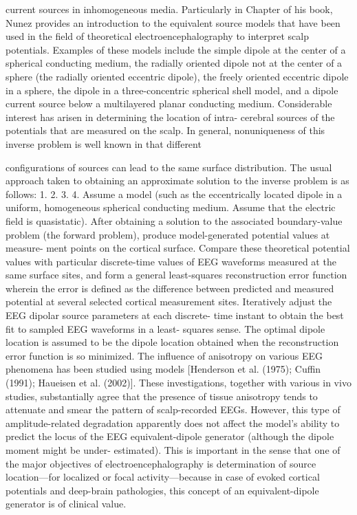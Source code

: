 current sources in inhomogeneous media. Particularly in Chapter of his book,
Nunez provides an introduction to the equivalent source models that have
been used in the field of theoretical electroencephalography to interpret scalp
potentials. Examples of these models include the simple dipole at the center of
a spherical conducting medium, the radially oriented dipole not at the center of
a sphere (the radially oriented eccentric dipole), the freely oriented eccentric
dipole in a sphere, the dipole in a three-concentric spherical shell model, and a
dipole current source below a multilayered planar conducting medium.
Considerable interest has arisen in determining the location of intra-
cerebral sources of the potentials that are measured on the scalp. In general,
nonuniqueness of this inverse problem is well known in that different

configurations of sources can lead to the same surface distribution. The usual
approach taken to obtaining an approximate solution to the inverse problem is
as follows:
1.
2.
3.
4.
Assume a model (such as the eccentrically located dipole in a uniform,
homogeneous spherical conducting medium. Assume that the electric
field is quasistatic).
After obtaining a solution to the associated boundary-value problem (the
forward problem), produce model-generated potential values at measure-
ment points on the cortical surface.
Compare these theoretical potential values with particular discrete-time
values of EEG waveforms measured at the same surface sites, and form a
general least-squares reconstruction error function wherein the error is
defined as the difference between predicted and measured potential at
several selected cortical measurement sites.
Iteratively adjust the EEG dipolar source parameters at each discrete-
time instant to obtain the best fit to sampled EEG waveforms in a least-
squares sense. The optimal dipole location is assumed to be the dipole
location obtained when the reconstruction error function is so minimized.
The influence of anisotropy on various EEG phenomena has been studied
using models [Henderson et al. (1975); Cuffin (1991); Haueisen et al. (2002)].
These investigations, together with various in vivo studies, substantially agree
that the presence of tissue anisotropy tends to attenuate and smear the pattern
of scalp-recorded EEGs. However, this type of amplitude-related degradation
apparently does not affect the model’s ability to predict the locus of the EEG
equivalent-dipole generator (although the dipole moment might be under-
estimated). This is important in the sense that one of the major objectives of
electroencephalography is determination of source location—for localized or
focal activity—because in case of evoked cortical potentials and deep-brain
pathologies, this concept of an equivalent-dipole generator is of clinical value.

